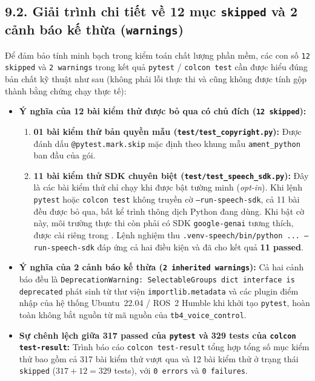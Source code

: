 \subsection*{9.2. Giải trình chi tiết về 12 mục \texttt{skipped} và 2 cảnh báo kế thừa (\texttt{warnings})}

Để đảm bảo tính minh bạch trong kiểm toán chất lượng phần mềm, các con số \texttt{12 skipped} và \texttt{2 warnings} trong kết quả \texttt{pytest} / \texttt{colcon test} cần được hiểu đúng bản chất kỹ thuật như sau (không phải lỗi thực thi và cũng không được tính gộp thành bằng chứng chạy thực tế):
\begin{itemize}[leftmargin=1.2cm]
  \item \textbf{Ý nghĩa của 12 bài kiểm thử được bỏ qua có chủ đích (\texttt{12 skipped}):}
  \begin{enumerate}
    \item \textbf{01 bài kiểm thử bản quyền mẫu (\texttt{test/test\_copyright.py}):} Được đánh dấu \texttt{@pytest.mark.skip} mặc định theo khung mẫu \texttt{ament\_python} ban đầu của gói.
    \item \textbf{11 bài kiểm thử SDK chuyên biệt (\texttt{test/test\_speech\_sdk.py}):} Đây là các bài kiểm thử chỉ chạy khi được bật tường minh (\textit{opt-in}). Khi lệnh \texttt{pytest} hoặc \texttt{colcon test} không truyền cờ \texttt{--run-speech-sdk}, cả 11 bài đều được bỏ qua, bất kể trình thông dịch Python đang dùng. Khi bật cờ này, môi trường thực thi còn phải có SDK \texttt{google-genai} tương thích, được cài riêng trong . Lệnh nghiệm thu \texttt{.venv-speech/bin/python ... --run-speech-sdk} đáp ứng cả hai điều kiện và đã cho kết quả \textbf{11 passed}.
  \end{enumerate}
  \item \textbf{Ý nghĩa của 2 cảnh báo kế thừa (\texttt{2 inherited warnings}):}
  Cả hai cảnh báo đều là \texttt{DeprecationWarning: SelectableGroups dict interface is deprecated} phát sinh từ thư viện \texttt{importlib.metadata} và các plugin điểm nhập của hệ thống Ubuntu~22.04 / ROS~2 Humble khi khởi tạo \texttt{pytest}, hoàn toàn không bắt nguồn từ mã nguồn của \texttt{tb4\_voice\_control}.
  \item \textbf{Sự chênh lệch giữa 317 passed của \texttt{pytest} và 329 tests của \texttt{colcon test-result}:}
  Trình báo cáo \texttt{colcon test-result} tổng hợp tổng số mục kiểm thử bao gồm cả 317 bài kiểm thử vượt qua và 12 bài kiểm thử ở trạng thái \texttt{skipped} ($317 + 12 = 329$ tests), với \texttt{0 errors} và \texttt{0 failures}.
\end{itemize}

